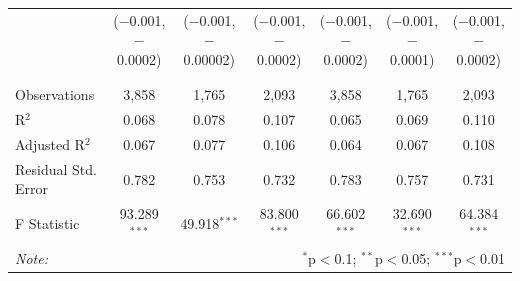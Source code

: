 \documentclass[alpha-refs]{wiley-article-01g}
\begin{document}
\begin{landscape}
\begin{table}[!htbp]
\begin{tabular}{@{\extracolsep{5pt}}lcccccc}
			& ($-$0.001, $-$0.0002) & ($-$0.001, $-$0.00002) & ($-$0.001, $-$0.0002) & ($-$0.001, $-$0.0002) & ($-$0.001, $-$0.0001) & ($-$0.001, $-$0.0002) \\ 
			& & & & & & \\ 
			\hline \\[-.8ex] 
			Observations & 3,858 & 1,765 & 2,093 & 3,858 & 1,765 & 2,093 \\ 
			R$^{2}$ & 0.068 & 0.078 & 0.107 & 0.065 & 0.069 & 0.110 \\ 
			Adjusted R$^{2}$ & 0.067 & 0.077 & 0.106 & 0.064 & 0.067 & 0.108 \\ 
			Residual Std. Error & 0.782 & 0.753 & 0.732 & 0.783 & 0.757 & 0.731 \\ 
			F Statistic & 93.289$^{***}$ & 49.918$^{***}$ & 83.800$^{***}$ & 66.602$^{***}$ & 32.690$^{***}$ & 64.384$^{***}$ \\ 
			\hline 
			\textit{Note:}  & \multicolumn{6}{r}{$^{*}$p$<$0.1; $^{**}$p$<$0.05; $^{***}$p$<$0.01} \\ 
		\end{tabular} 
	\end{table} 
	
\end{landscape}

\newpage
\end{document}
